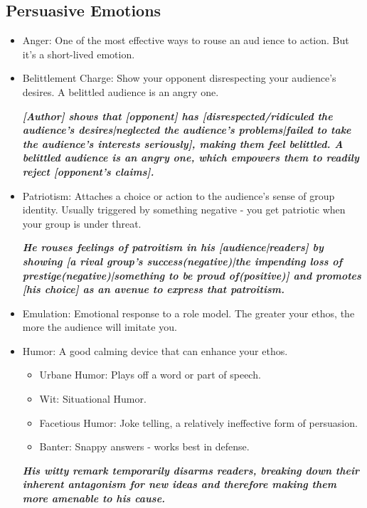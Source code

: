 \subsection{Persuasive Emotions}
\begin{itemize}
	\item Anger: One of the most effective ways to rouse an aud ience to action. But it's a short-lived emotion.
	\item Belittlement Charge: Show your opponent disrespecting your audience's desires. A belittled audience is an angry one.
	
\emph{\textbf{[Author] shows that [opponent] has [disrespected/ridiculed the audience's desires|neglected the audience's problems|failed to take the audience's interests seriously], making them feel belittled. A belittled audience is an angry one, which empowers them to readily reject [opponent's claims].}}

	\item Patriotism: Attaches a choice or action to the audience's sense of group identity. Usually triggered by something negative - you get patriotic when your group is under threat.
	
\textbf{\emph{	He rouses feelings of patroitism in his [audience|readers] by showing [a rival group's success(negative)|the impending loss of prestige(negative)|something to be proud of(positive)] and promotes [his choice] as an avenue to express that patroitism.}}	
	
	\item Emulation: Emotional response to a role model. The greater your ethos, the more the audience will imitate you.
	\item Humor: A good calming device that can enhance your ethos.
		\begin{itemize}
			\item Urbane Humor: Plays off a word or part of speech.
			\item Wit: Situational Humor.
			\item Facetious Humor: Joke telling, a relatively ineffective form of persuasion.
			\item Banter: Snappy answers - works best in defense.
		\end{itemize}
		
\emph{\textbf{His witty remark temporarily disarms readers, breaking down their inherent antagonism for new ideas and therefore making them more amenable to his cause.}}
\end{itemize}

